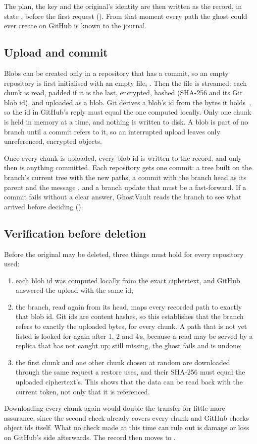 The plan, the key and the original's identity are then written as the record, in state
, before the first request (). From that moment every path the
ghost could ever create on GitHub is known to the journal.

\subsection{Upload and commit}
Blobs can be created only in a repository that has a commit, so an empty repository is first
initialised with an empty file, . Then the file is streamed: each chunk is
read, padded if it is the last, encrypted, hashed (SHA-256 and its Git blob id), and uploaded as a
blob. Git derives a blob's id from the bytes it holds~\cite{git-objects}, so the id in GitHub's
reply must equal the one computed locally. Only one chunk is held in memory at a time, and nothing is written to disk. A
blob is part of no branch until a commit refers to it, so an interrupted upload leaves only
unreferenced, encrypted objects.

Once every chunk is uploaded, every blob id is written to the record, and only then is anything
committed. Each repository gets one commit: a tree built on the branch's current tree with the new
paths, a commit with the branch head as its parent and the message , and a branch
update that must be a fast-forward. If a commit fails without a clear answer, GhostVault reads the
branch to see what arrived before deciding ().

\subsection{Verification before deletion}\label{sec:verify}
Before the original may be deleted, three things must hold for every repository used:
\begin{enumerate}
\item each blob id was computed locally from the exact ciphertext, and GitHub answered the upload
with the same id;
\item the branch, read again from its head, maps every recorded path to exactly that blob id. Git ids
are content hashes, so this establishes that the branch refers to exactly the uploaded bytes, for
every chunk. A path that is not yet listed is looked for again after 1, 2 and 4\,s, because a read
may be served by a replica that has not caught up; still missing, the ghost fails and is undone;
\item the first chunk and one other chunk chosen at random are downloaded through the same request a
restore uses, and their SHA-256 must equal the uploaded ciphertext's. This shows that the data can be
read back with the current token, not only that it is referenced.
\end{enumerate}
Downloading every chunk again would double the transfer for little more assurance, since the second
check already covers every chunk and GitHub checks object ids itself. What no check made at this
time can rule out is damage or loss on GitHub's side afterwards. The record then moves to
.

